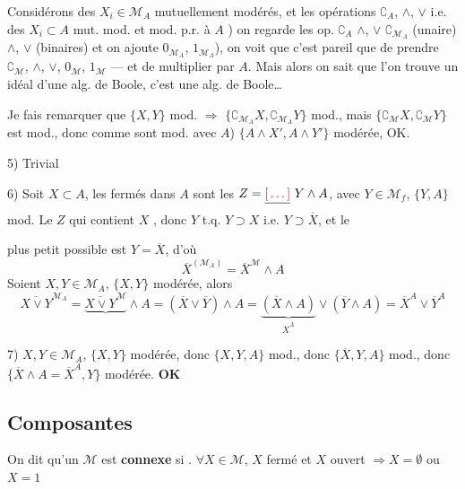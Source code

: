 \documentclass[11pt,a4paper]{article}
\begin{document}
Considérons des  $X_i \in \mathcal{M}_A$ mutuellement modérés, et les opérations $\complement_A$, $\wedge$, $\vee$  i.e. des $X_i \subset A$ mut. mod. et mod. p.r. à $A$ ) on regarde les op. $\complement_A$ $\wedge$, $\vee$  $\complement_{\mathcal{M}_A}$ (unaire) $\wedge$, $\vee$ (binaires) et on ajoute $0_{\mathcal{M}_A}$, $1_{\mathcal{M}_A}$), on voit que c'est pareil que \struck{\ill{}} de prendre $\complement_{\mathcal{M}}$, $\wedge$, $\vee$, $0_{\mathcal{M}}$, $1_{\mathcal{M}}$ — et de multiplier par $A$. Mais alors on sait que l'on trouve un idéal d'une alg. de Boole, c'est une alg. de Boole…

 Je fais remarquer que $\{X, Y\}$ mod. $\Rightarrow$ $\{\complement_{\mathcal{M}_A} X, \complement_{\mathcal{M}_A} Y\}$ mod., mais $\{\complement_{\mathcal{M}} X, \complement_{\mathcal{M}} Y\}$ \ill{} est mod., donc comme \struck{\ill{}} \ill{} sont mod. avec $A$) $\{A \wedge X', A \wedge Y'\}$ modérée, OK.

5) Trivial

6) Soit $X \subset A$, les fermés dans $A$ sont les $Z = \struck{\ill{}}\ Y \wedge A$, avec $Y \in \mathcal{M}_f$, $\{Y, A\}$ mod. \struck{\ill{}} Le $Z$ qui contient $X$ \struck{\ill{}}, donc $Y$ t.q. $Y \supset X$ i.e. $Y \supset \overline{X}$, et le

plus petit possible est $Y = \overline{X}$, d'où 
\[
  \overline{X}^{(\mathcal{M}_A)} = \overline{X}^{\mathcal{M}} \wedge A
\]
Soient $X, Y \in \mathcal{M}_A$, $\{X, Y\}$ modérée, alors
\[
  \overline{X \vee Y}^{\mathcal{M}_A} = \underbrace{\overline{X \vee Y}^{\mathcal{M}}}_{} \wedge A = (\overline{X} \vee \overline{Y}) \wedge A = \underbrace{(\overline{X} \wedge A)}_{\overline{X}^{A}} \vee (\overline{Y} \wedge A) = \overline{X}^{A} \vee \overline{Y}^{A}
\]

7) $X, Y \in \mathcal{M}_A$, $\{X, Y\}$ modérée, donc  $\{X, Y, A\}$ mod., donc $\{\overline{X}, Y, A\}$ mod., donc $\{\overline{X} \wedge A = \overline{X}^{A}, Y\}$ modérée. \textbf{OK}

\subsection{Composantes}

On dit qu'un $\mathcal{M}$ est \textbf{connexe} si  . $\forall X \in \mathcal{M}$, $X$ fermé et $X$ ouvert $\Longrightarrow X = \emptyset$ ou $X = 1$
\end{document}

